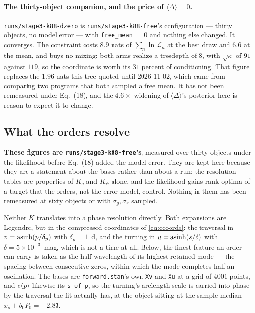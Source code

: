 \documentclass[11pt]{article}
\newcommand{\file}[1]{\texttt{#1}}
\newcommand{\code}[1]{\texttt{#1}}
\begin{document}
\paragraph{The thirty-object companion, and the price of $\langle\Delta\rangle = 0$.}
\file{runs/stage3-k88-dzero} is \file{runs/stage3-k88-free}'s configuration --- thirty
objects, no model error --- with \code{free\_mean} $= 0$ and nothing else changed. It
converges. The constraint costs $8.9$ nats of $\sum_{n}\ln\mathcal{L}_{n}$ at the best draw
and $6.6$ at the mean, and buys no mixing: both arms realize a treedepth of $8$, with
$\sqrt{\kappa}$ of $91$ against $119$, so the coordinate is worth its $31$ percent of
conditioning. That figure replaces the $1.96$ nats this tree quoted until 2026-11-02, which
came from comparing two programs that both sampled a free mean. It has not been remeasured
under Eq.~(18), and the $4.6\times$ widening of $\langle\Delta\rangle$'s posterior
here is reason to expect it to change.

\subsection{What the orders resolve}
\label{sec:run1res}

\textbf{These figures are \file{runs/stage3-k88-free}'s}, measured over thirty objects
under the likelihood before Eq.~(18) added the model error. They are kept here because they
are a statement about the bases rather than about a run: the resolution tables are
properties of $K_{q}$ and $K_{\psi}$ alone, and the likelihood gains rank optima of a
target that the orders, not the error model, control. Nothing in them has been remeasured
at sixty objects or with $\sigma_{g}, \sigma_{r}$ sampled.

Neither $K$ translates into a phase resolution directly. Both expansions are Legendre, but
in the compressed coordinates of \eqref{eq:ccoords}: the traversal in
$v = \operatorname{asinh}(p/\delta_{p})$ with $\delta_{p} = 1$~d, and the turning in
$u = \operatorname{asinh}(s/\delta)$ with $\delta = 5\times10^{-3}$~mag, which is not a time at all.
Below, the finest feature an order can carry is taken as the half wavelength of its
highest retained mode --- the spacing between consecutive zeros, within which the mode
completes half an oscillation. The bases are \file{forward.stan}'s own \code{Xv} and
\code{Xu} at a grid of $4001$ points, and $s(p)$ likewise its \code{s\_of\_p}, so
the turning's arclength scale is carried into phase by the traversal the fit actually has,
at the object sitting at the sample-median $x_{s} + b_{0}P_{0} = -2.83$.
\end{document}

